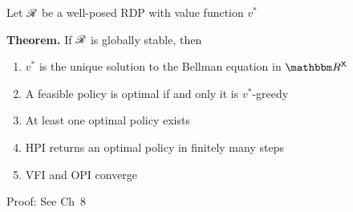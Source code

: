 \documentclass[dvipsnames]{beamer}
\begin{document}
\begin{frame}

    Let $\mathscr R$ be a well-posed RDP with value function $v^*$

    \vspace{0.5em}
    \vspace{0.5em}
    \begin{block}{\vspace*{-3ex}}
        {\bf Theorem.} If $\mathscr R$ is globally stable, then
        \vspace{0.5em}
        \begin{enumerate}
            \item $v^*$ is the unique solution to the Bellman equation
                in $\RR^\Xsf$
            \vspace{0.5em}
            \item A feasible policy is optimal if and only it is
                $v^*$-greedy
            \vspace{0.5em}
            \item At least one optimal policy exists
            \vspace{0.5em}
            \item HPI returns an optimal policy in finitely
                many steps
            \vspace{0.5em}
            \item VFI and OPI converge
        \end{enumerate}
    \end{block}

    \vspace{0.5em}

    Proof: See Ch~8

\end{frame}
\end{document}
